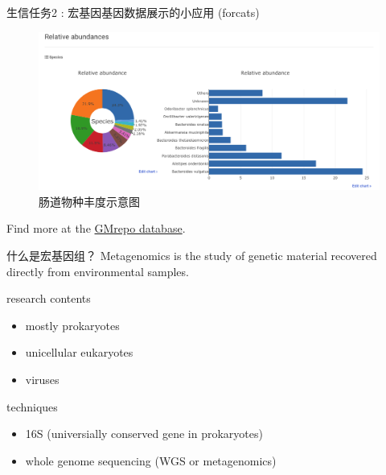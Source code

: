 \documentclass[ignorenonframetext,]{beamer}
\providecommand{\tightlist}{%
  \setlength{\itemsep}{0pt}\setlength{\parskip}{0pt}}
\begin{document}
\begin{frame}{生信任务2 : 宏基因基因数据展示的小应用 (forcats)}
\protect\hypertarget{ux751fux4fe1ux4efbux52a12-ux5b8fux57faux56e0ux57faux56e0ux6570ux636eux5c55ux793aux7684ux5c0fux5e94ux7528-forcats}{}
\begin{figure}
\centering
\includegraphics[width=\textwidth,height=0.6\textheight]{images/talk06/gmrepo_run_statistics.png}
\caption{肠道物种丰度示意图}
\end{figure}

Find more at the \href{https://gmrepo.humangut.info/home}{GMrepo
database}.
\end{frame}

\begin{frame}{什么是宏基因组？}
\protect\hypertarget{ux4ec0ux4e48ux662fux5b8fux57faux56e0ux7ec4}{}
Metagenomics is the study of genetic material recovered directly from
environmental samples.

\begin{block}{research contents}
\protect\hypertarget{research-contents}{}
\begin{itemize}
\tightlist
\item
  mostly prokaryotes
\item
  unicellular eukaryotes
\item
  viruses
\end{itemize}
\end{block}

\begin{block}{techniques}
\protect\hypertarget{techniques}{}
\begin{itemize}
\tightlist
\item
  16S (universially conserved gene in prokaryotes)
\item
  whole genome sequencing (WGS or metagenomics)
\end{itemize}
\end{block}
\end{frame}
\end{document}
